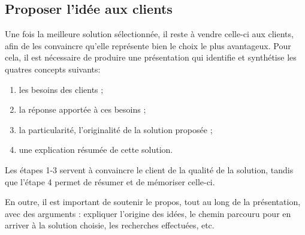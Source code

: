 \documentclass[a4paper,12pt, oneside]{article}
\begin{document}
\subsection{Proposer l'idée aux clients}

Une fois la meilleure solution sélectionnée, il reste à \og{}vendre\fg{} celle-ci aux clients, afin de les convaincre qu'elle représente bien le choix le plus avantageux. Pour cela, il est nécessaire de produire une présentation qui identifie et synthétise les quatres concepts suivants:

\begin{enumerate}
    \item les besoins des clients ;
    \item la réponse apportée à ces besoins ;
    \item la particularité, l'originalité de la solution proposée ;
    \item une explication résumée de cette solution.
\end{enumerate}

Les étapes 1-3 servent à convaincre le client de la qualité de la solution, tandis que l'étape 4 permet de résumer et de mémoriser celle-ci.

En outre, il est important de soutenir le propos, tout au long de la présentation, avec des arguments : expliquer l'origine des idées, le chemin parcouru pour en arriver à la solution choisie, les recherches effectuées, etc.
\end{document}
